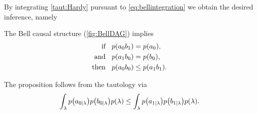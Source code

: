 By integrating \cref{taut:Hardy} pursuant to \cref{eq:bellintegration} we obtain the desired inference, namely







\begin{prop} \label{prop:BellNoGo}
The Bell causal structure (\cref{fig:BellDAG}) implies
\begin{align*}
\text{if  }\;\; \p{a_0 b_1}&=\p{a_0},\\
\text{and }\;\; \p{a_1 b_0}&=\p{b_0},\\
\text{then }\;\; \p{a_0 b_0}&\leq \p{a_1 b_1}.
\end{align*}
\end{prop}

The proposition follows from the tautology via
\begin{align}
\int_{\lambda}\p{a_{0|\lambda}}\p{b_{0|\lambda}}\p{\lambda} \leq \int_{\lambda}\p{a_{1|\lambda}}\p{b_{1|\lambda}}\p{\lambda}.
\end{align}


